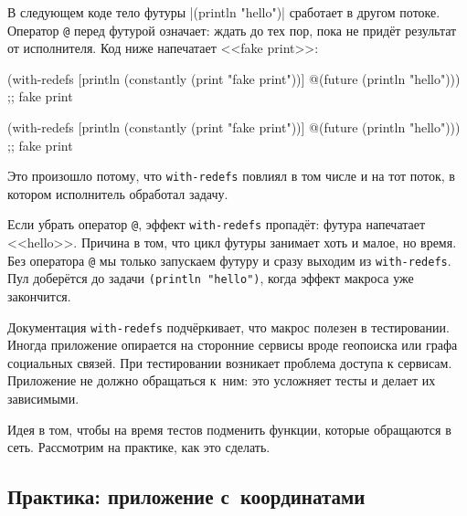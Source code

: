 В следующем коде тело футуры \spverb|(println "hello")| сработает в другом
потоке. Оператор \verb|@| перед футурой означает: ждать до тех пор, пока не
придёт результат от исполнителя. Код ниже напечатает <<fake print>>:


\ifnarrow

\begin{english}
  \begin{clojure}
(with-redefs
  [println (constantly
             (print "fake print"))]
  @(future (println "hello")))
;; fake print
  \end{clojure}
\end{english}

\else

\begin{english}
  \begin{clojure}
(with-redefs
  [println (constantly (print "fake print\n"))]
  @(future (println "hello")))
;; fake print
  \end{clojure}
\end{english}

\fi

Это произошло потому, что \verb|with-redefs| повлиял в том числе и на тот
поток, в котором исполнитель обработал задачу.

Если убрать оператор \verb|@|, эффект \verb|with-redefs| пропадёт: футура
напечатает <<hello>>. Причина в том, что цикл футуры занимает хоть и малое, но
время. Без оператора \verb|@| мы только запускаем футуру и сразу выходим из
\verb|with-redefs|. Пул доберётся до задачи \verb|(println "hello")|, когда
эффект макроса уже закончится.

Документация \verb|with-redefs| подчёркивает, что макрос полезен в
тестировании. Иногда приложение опирается на сторонние сервисы вроде геопоиска
или графа социальных связей. При тестировании возникает проблема доступа к
сервисам. Приложение не должно обращаться к~ним: это усложняет тесты и делает их
зависимыми.

Идея в том, чтобы на время тестов подменить функции, которые обращаются в
сеть. Рассмотрим на практике, как это сделать.

\subsection{Практика: приложение с~координатами}


